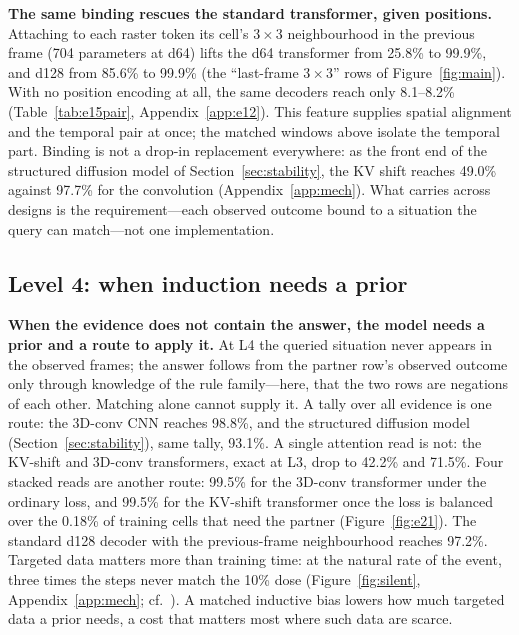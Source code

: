 \documentclass[11pt]{article}
\begin{document}
\textbf{The same binding rescues the standard transformer, given positions.} Attaching to each raster token its cell's $3{\times}3$ neighbourhood in the previous frame (704 parameters at d64) lifts the d64 transformer from 25.8\% to 99.9\%, and d128 from 85.6\% to 99.9\% (the ``last-frame $3{\times}3$'' rows of Figure~\ref{fig:main}). With no position encoding at all, the same decoders reach only 8.1--8.2\% (Table~\ref{tab:e15pair}, Appendix~\ref{app:e12}). This feature supplies spatial alignment and the temporal pair at once; the matched windows above isolate the temporal part. Binding is not a drop-in replacement everywhere: as the front end of the structured diffusion model of Section~\ref{sec:stability}, the KV shift reaches 49.0\% against 97.7\% for the convolution (Appendix~\ref{app:mech}). What carries across designs is the requirement---each observed outcome bound to a situation the query can match---not one implementation.

\subsection{Level 4: when induction needs a prior}
\label{sec:silent}

\textbf{When the evidence does not contain the answer, the model needs a prior and a route to apply it.} At L4 the queried situation never appears in the observed frames; the answer follows from the partner row's observed outcome only through knowledge of the rule family---here, that the two rows are negations of each other. Matching alone cannot supply it. A tally over all evidence is one route: the 3D-conv CNN reaches 98.8\%, and the structured diffusion model (Section~\ref{sec:stability}), same tally, 93.1\%. A single attention read is not: the KV-shift and 3D-conv transformers, exact at L3, drop to 42.2\% and 71.5\%. Four stacked reads are another route: 99.5\% for the 3D-conv transformer under the ordinary loss, and 99.5\% for the KV-shift transformer once the loss is balanced over the 0.18\% of training cells that need the partner (Figure~\ref{fig:e21}). The standard d128 decoder with the previous-frame neighbourhood reaches 97.2\%. Targeted data matters more than training time: at the natural rate of the event, three times the steps never match the 10\% dose (Figure~\ref{fig:silent}, Appendix~\ref{app:mech}; cf.\ \citealp{chan2022data, reddy2024mechanistic}). A matched inductive bias lowers how much targeted data a prior needs, a cost that matters most where such data are scarce.
\end{document}
